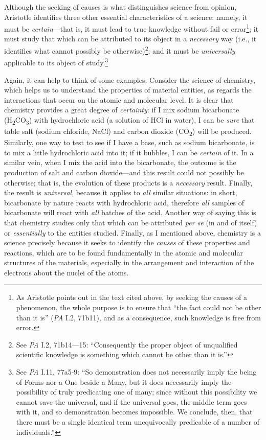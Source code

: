 \documentclass[
  12pt,
]{memoir}
\begin{document}
Although the seeking of causes is what distinguishes science from
opinion, Aristotle identifies three other essential characteristics of a
science: namely, it must be \emph{certain}---that is, it must lead to
true knowledge without fail or error\footnote{As Aristotle points out in
  the text cited above, by seeking the causes of a phenomenon, the whole
  purpose is to ensure that ``the fact could not be other than it is''
  (\emph{PA} I.2, 71b11), and as a consequence, such knowledge is free
  from error.}; it must study that which can be attributed to its object
in a \emph{necessary} way (i.e., it identifies what cannot possibly be
otherwise)\footnote{See \emph{PA} I.2, 71b14---15: ``Consequently the
  proper object of unqualified scientific knowledge is something which
  cannot be other than it is.''}; and it must be \emph{universally}
applicable to its object of study.\footnote{See \emph{PA} I.11, 77a5-9:
  ``So demonstration does not necessarily imply the being of Forms nor a
  One beside a Many, but it does necessarily imply the possibility of
  truly predicating one of many; since without this possibility we
  cannot save the universal, and if the universal goes, the middle term
  goes with it, and so demonstration becomes impossible. We conclude,
  then, that there must be a single identical term unequivocally
  predicable of a number of individuals.''}

Again, it can help to think of some examples. Consider the science of
chemistry, which helps us to understand the properties of material
entities, as regards the interactions that occur on the atomic and
molecular level. It is clear that chemistry provides a great degree of
\emph{certainty}: if I mix sodium bicarbonate
(H\textsubscript{2}CO\textsubscript{3}) with hydrochloric acid (a
solution of HCl in water), I can be \emph{sure} that table salt (sodium
chloride, NaCl) and carbon dioxide (CO\textsubscript{2}) will be
produced. Similarly, one way to test to see if I have a base, such as
sodium bicarbonate, is to mix a little hydrochloric acid into it; if it
bubbles, I can be \emph{certain} of it. In a similar vein, when I mix
the acid into the bicarbonate, the outcome is the production of salt and
carbon dioxide---and this result could not possibly be otherwise; that
is, the evolution of these products is a \emph{necessary} result.
Finally, the result is \emph{universal}, because it applies to
\emph{all} similar situations: in short, bicarbonate by nature reacts
with hydrochloric acid, therefore \emph{all} samples of bicarbonate will
react with \emph{all} batches of the acid. Another way of saying this is
that chemistry studies only that which can be attributed \emph{per se}
(in and of itself) or \emph{essentially} to the entities studied.
Finally, as I mentioned above, chemistry is a science precisely because
it seeks to identify the \emph{causes} of these properties and
reactions, which are to be found fundamentally in the atomic and
molecular structures of the materials, especially in the arrangement and
interaction of the electrons about the nuclei of the atoms.
\end{document}
